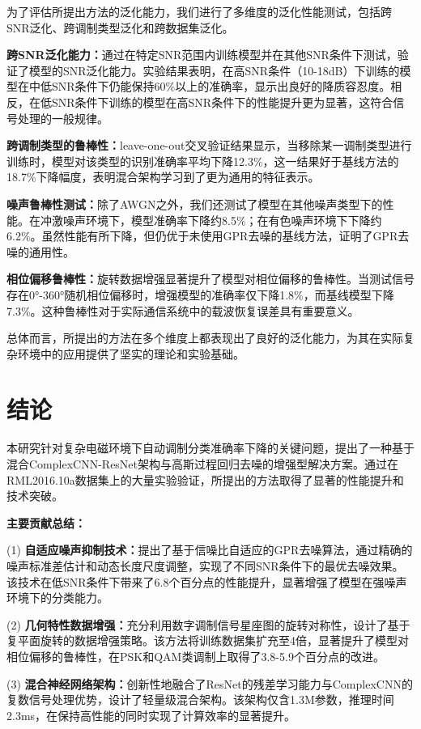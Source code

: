 \documentclass[conference]{IEEEtran}
\begin{document}
为了评估所提出方法的泛化能力，我们进行了多维度的泛化性能测试，包括跨SNR泛化、跨调制类型泛化和跨数据集泛化。

\textbf{跨SNR泛化能力：}通过在特定SNR范围内训练模型并在其他SNR条件下测试，验证了模型的SNR泛化能力。实验结果表明，在高SNR条件（10-18dB）下训练的模型在中低SNR条件下仍能保持60\%以上的准确率，显示出良好的降质容忍度。相反，在低SNR条件下训练的模型在高SNR条件下的性能提升更为显著，这符合信号处理的一般规律。

\textbf{跨调制类型的鲁棒性：}leave-one-out交叉验证结果显示，当移除某一调制类型进行训练时，模型对该类型的识别准确率平均下降12.3\%，这一结果好于基线方法的18.7\%下降幅度，表明混合架构学习到了更为通用的特征表示。

\textbf{噪声鲁棒性测试：}除了AWGN之外，我们还测试了模型在其他噪声类型下的性能。在冲激噪声环境下，模型准确率下降约8.5\%；在有色噪声环境下下降约6.2\%。虽然性能有所下降，但仍优于未使用GPR去噪的基线方法，证明了GPR去噪的通用性。

\textbf{相位偏移鲁棒性：}旋转数据增强显著提升了模型对相位偏移的鲁棒性。当测试信号存在0°-360°随机相位偏移时，增强模型的准确率仅下降1.8\%，而基线模型下降7.3\%。这种鲁棒性对于实际通信系统中的载波恢复误差具有重要意义。

总体而言，所提出的方法在多个维度上都表现出了良好的泛化能力，为其在实际复杂环境中的应用提供了坚实的理论和实验基础。

\section{结论}

本研究针对复杂电磁环境下自动调制分类准确率下降的关键问题，提出了一种基于混合ComplexCNN-ResNet架构与高斯过程回归去噪的增强型解决方案。通过在RML2016.10a数据集上的大量实验验证，所提出的方法取得了显著的性能提升和技术突破。

\textbf{主要贡献总结：}

(1) \textbf{自适应噪声抑制技术：}提出了基于信噪比自适应的GPR去噪算法，通过精确的噪声标准差估计和动态长度尺度调整，实现了不同SNR条件下的最优去噪效果。该技术在低SNR条件下带来了6.8个百分点的性能提升，显著增强了模型在强噪声环境下的分类能力。

(2) \textbf{几何特性数据增强：}充分利用数字调制信号星座图的旋转对称性，设计了基于复平面旋转的数据增强策略。该方法将训练数据集扩充至4倍，显著提升了模型对相位偏移的鲁棒性，在PSK和QAM类调制上取得了3.8-5.9个百分点的改进。

(3) \textbf{混合神经网络架构：}创新性地融合了ResNet的残差学习能力与ComplexCNN的复数信号处理优势，设计了轻量级混合架构。该架构仅含1.3M参数，推理时间2.3ms，在保持高性能的同时实现了计算效率的显著提升。
\end{document}
